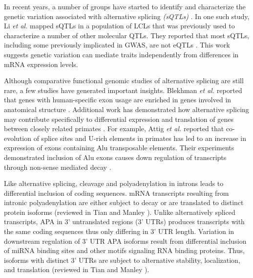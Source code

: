 In recent years, a number of groups have started to identify and characterize the genetic variation associated with alternative splicing \emph{(sQTLs)} \citep{takata_genome-wide_2017, li_rna_2016, ongen_alternative_2015, ma_splicing_2018, tian_cancersplicingqtl_2019}. In one such study, Li \emph{et al.} mapped sQTLs in a population of LCLs that was previously used to characterize a number of other molecular QTLs. They reported that most sQTLs, including some previously implicated in GWAS, are not eQTLs \citep{li_rna_2016}. This work suggests genetic variation can mediate traits independently from differences in mRNA expression levels. 

Although comparative functional genomic studies of alternative splicing are still rare, a few studies have generated important insights. Blekhman \emph{et al.} reported that genes with human-specific exon usage are enriched in genes involved in anatomical structure \citep{blekhman_sex-specific_2010}. Additional work has demonstrated how alternative splicing may contribute specifically to differential expression and translation of genes between closely related primates \citep{lin_evolution_2010, attig_splicing_2016}. For example, Attig \emph{et al.} reported that co-evolution of splice sites and U-rich elements in primates has led to an increase in expression of exons containing Alu transposable elements. Their experiments demonstrated inclusion of Alu exons causes down regulation of transcripts through non-sense mediated decay \cite{attig_splicing_2016}.

 Like alternative splicing, cleavage and polyadenylation in introns leads to differential inclusion of coding sequences. mRNA transcripts resulting from intronic polyadenylation are either subject to decay or are translated to distinct protein isoforms (reviewed in Tian and Manley \citep{tian_alternative_2017}). Unlike alternatively spliced transcripts, APA in 3' untranslated regions (3' UTRs) produces transcripts with the same coding sequences thus only differing in 3' UTR length. Variation in downstream regulation of 3' UTR APA isoforms result from differential inclusion of miRNA binding sites and other motifs signaling RNA binding proteins. Thus, isoforms with distinct 3' UTRs are subject to alternative stability, localization, and translation (reviewed in Tian and Manley \citep{tian_alternative_2017}).
 
